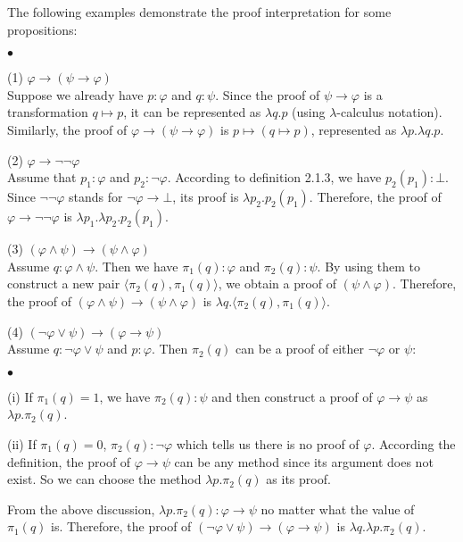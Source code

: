 \documentclass[12pt,a4paper]{article}
\theoremstyle{definition}
\theoremstyle{plain}
\theoremstyle{plain}
\theoremstyle{plain}
\newenvironment{myitemize}
{\begin{list}{$ \bullet $}{
  \topsep=2pt
  \itemsep=2pt
  \parsep=0pt
  \parskip=0pt
  \labelsep=5pt
  \labelwidth=20pt}}
{\end{list}}
\begin{document}
The following examples demonstrate the proof interpretation for some propositions:
\begin{myitemize}
\item[(1)] $ \varphi \to ( \psi \to \varphi ) $\\
Suppose we already have $ p: \varphi $ and $ q: \psi $. Since the proof of $ \psi \to \varphi $ is a transformation $ q \mapsto p $, it can be represented as $ \lambda q . p $ (using $ \lambda $-calculus notation). Similarly, the proof of $ \varphi \to ( \psi \to \varphi ) $ is $ p \mapsto ( q \mapsto p ) $, represented as $ \lambda p . \lambda q . p $.
\item[(2)] $ \varphi \to \neg \neg \varphi $\\
Assume that $ p_1 : \varphi $ and $ p_2 : \neg \varphi $. According to definition 2.1.3, we have $ p_2 ( p_1 ) : \bot $. Since $ \neg \neg \varphi $ stands for $ \neg \varphi \to \bot $, its proof is $ \lambda p_2 . p_2 ( p_1 ) $. Therefore, the proof of $ \varphi \to \neg \neg \varphi $ is $ \lambda p_1 . \lambda p_2 . p_2 ( p_1 ) $.
\item[(3)] $ ( \varphi \land \psi ) \to ( \psi \land \varphi ) $\\
Assume $ q: \varphi \land \psi $. Then we have $ \pi _1 (q): \varphi $ and $\pi _2 (q): \psi $. By using them to construct a new pair $ \langle \pi _2 (q), \pi _1 (q) \rangle $, we obtain a proof of $( \psi \land \varphi ) $. Therefore, the proof of $ ( \varphi \land \psi ) \to ( \psi \land \varphi ) $ is $ \lambda q. \langle \pi _2 (q), \pi _1 (q) \rangle $.
\item[(4)] $ ( \neg \varphi \lor \psi ) \to ( \varphi \to \psi ) $\\
Assume $ q: \neg \varphi \lor \psi $ and $ p: \varphi $. Then $ \pi _2 (q)$ can be a proof of either $ \neg \varphi $ or $ \psi $:
  \begin{myitemize}
  \item[(i)] If $ \pi _1 (q) = 1 $, we have $ \pi _2 (q) : \psi $ and then construct a proof of $ \varphi \to \psi $ as $ \lambda p. \pi _2 (q) $.
  \item[(ii)] If $ \pi _1 (q) = 0 $, $ \pi _2 (q): \neg \varphi $ which tells us there is no proof of $ \varphi $. According the definition, the proof of $ \varphi \to \psi $ can be any method since its argument does not exist. So we can choose the method $ \lambda p. \pi _2 (q) $ as its proof.
  \end{myitemize}
From the above discussion, $ \lambda p. \pi _2 (q): \varphi \to \psi $ no matter what the value of $ \pi _1 (q) $ is. Therefore, the proof of $ ( \neg \varphi \lor \psi ) \to ( \varphi \to \psi ) $ is $ \lambda q. \lambda p. \pi _2 (q) $.
\end{myitemize}
\end{document}
